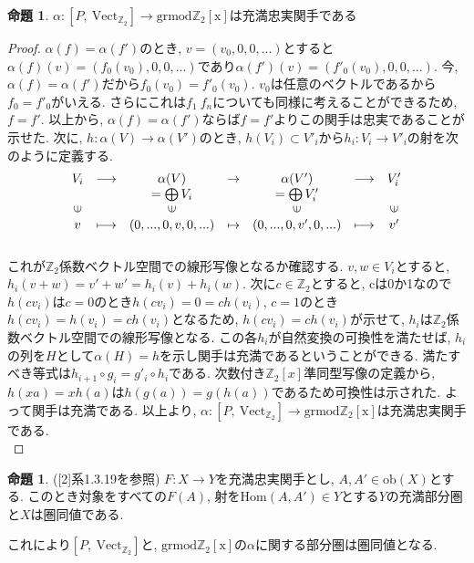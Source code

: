 \documentclass[a4paper]{jsarticle}
\theoremstyle{definition}
\newtheorem{prop}[dfn]{命題}
\newcommand{\Fun}[2]{[#1,~#2]}
\newcommand{\Vect}{{\mathrm{Vect}}}
\newcommand{\grmodZ}{{\mathrm{grmod \mathbb{Z}_2[x]}}}
\newcommand{\Hom}{{\mathrm{Hom}}}
\newcommand{\ob}{{\mathrm{ob}}}
\begin{document}
 
\begin{prop}
    $\alpha:\Fun{P}{\Vect_{\mathbb{Z}_2}}\rightarrow \grmodZ$は充満忠実関手である
\end{prop}
\begin{proof}
 $\alpha(f)=\alpha(f')$のとき, $v=(v_0,0,0,...)$とすると$\alpha(f)(v)=(f_0(v_0),0,0,...)$であり$\alpha(f')(v)=(f'_0(v_0),0,0,...)$. 今, $\alpha(f)=\alpha(f')$だから$f_0(v_0)=f'_0(v_0)$. $v_0$は任意のベクトルであるから$f_0=f'_0$がいえる. さらにこれは$f_1~f_n$についても同様に考えることができるため, $f=f'$. 以上から, $\alpha(f)=\alpha(f')$ならば$f=f'$よりこの関手は忠実であることが示せた. 次に, $h:\alpha(V)\rightarrow \alpha(V')$のとき, $h(V_i)\subset V'_i$から$h_i:V_i\rightarrow V'_i$の射を次のように定義する.
\begin{equation}
    \begin{array}{ccccccc}
         V_i&\longrightarrow& \alpha(V) & \rightarrow & \alpha(V')& \longrightarrow&V'_i\\
         &              &  =\bigoplus V_i &             &    =\bigoplus V'_i     & &\\
       \rotatebox{90}{$\in$} & &\rotatebox{90}{$\in$} & & \rotatebox{90}{$\in$} & & \rotatebox{90}{$\in$}\\
        v& \longmapsto & (0,...,0,v,0,...) &\mapsto & (0,...,0,v',0,...)& \longmapsto & v'\\\notag
    \end{array}
\end{equation}
これが$\mathbb{Z}_2$係数ベクトル空間での線形写像となるか確認する. $v, w\in V_i$とすると, 
$h_i(v+w)=v'+w'=h_i(v)+h_i(w)$. 次に$c\in\mathbb{Z}_2$とすると, cは0か1なので$h(cv_i)$は$c=0$のとき$h(cv_i)=0=ch(v_i)$, $c=1$のとき$h(cv_i)=h(v_i)=ch(v_i)$となるため, $h(cv_i)=ch(v_i)$が示せて, $h_i$は$\mathbb{Z}_2$係数ベクトル空間での線形写像となる. この各$h_i$が自然変換の可換性を満たせば, $h_i$の列を$H$として$\alpha(H)=h$を示し関手は充満であるということができる. 満たすべき等式は$h_{i+1}\circ g_i=g'_i\circ h_{i}$である. 次数付き$\mathbb{Z}_2[x]$準同型写像の定義から, $h(xa)=xh(a)$は$h(g(a))=g(h(a))$であるため可換性は示された. よって関手は充満である. 以上より, $\alpha:\Fun{P}{\Vect_{\mathbb{Z}_2}}\rightarrow \grmodZ$は充満忠実関手である.\\
\end{proof}
\begin{prop}([2]系1.3.19を参照)
    $F:X\rightarrow Y$を充満忠実関手とし, $A, A'\in \ob(X)$とする. このとき対象をすべての$F(A)$, 射を$\Hom(A,A')\in Y$とする$Y$の充満部分圏と$X$は圏同値である. 
\end{prop}
これにより$\Fun{P}{\Vect_{\mathbb{Z}_2}}$と, $\grmodZ$の$\alpha$に関する部分圏は圏同値となる.
\end{document}
